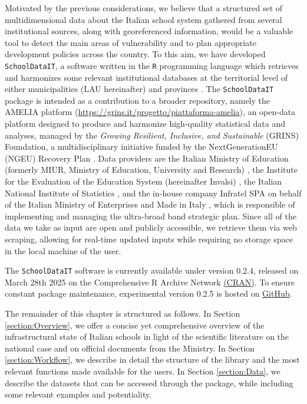 \documentclass{book}
\begin{document}
Motivated by the previous considerations, we believe that a structured set of multidimensional data about the Italian school system gathered from several institutional sources, along with georeferenced information, would be a valuable tool to detect the main areas of vulnerability and to plan appropriate development policies across the country. To this aim, we have developed \texttt{SchoolDataIT}, a software written in the \texttt{R} programming language \citep{R} which retrieves and harmonizes some relevant institutional databases at the territorial level of either municipalities (LAU hereinafter) and provinces \citep[NUTS-3 henceforth, ][]{NUTS2024}. 
The \texttt{SchoolDataIT} package is intended as a contribution to a broader repository, namely the AMELIA platform (\url{https://grins.it/progetto/piattaforma-amelia}), an open-data platform designed to produce and harmonize high-quality statistical data and analyses, managed by the \textit{Growing Resilient, Inclusive, and Sustainable} (GRINS) Foundation, a multidisciplinary initiative funded by the NextGenerationEU (NGEU) Recovery Plan \citep{CrescenziEtAl2021, DeLaPorteJensen2021}. 
Data providers are the Italian Ministry of Education (formerly MIUR, Ministry of Education, University and Research) \citep{MIUR}, the Institute for the Evaluation of the Education System (hereinafter Invalsi) \citep{Invalsi_IS}, the Italian National Institute of Statistics \citep[ISTAT,][]{InnerAreas, Situas, Shapefiles}, and the in-house company Infratel SPA on behalf of the Italian Ministry of Enterprises and Made in Italy \citep[MIMIT,][]{BB}, which is responsible of implementing and managing the ultra-broad band strategic plan. Since all of the data we take as input are open and publicly accessible, we retrieve them via web scraping, allowing for real-time updated inputs while requiring no storage space in the local machine of the user.


The \texttt{SchoolDataIT} software is currently available under version 0.2.4, released on March 28th 2025 on the Comprehensive R Archive Network \href{https://cran.r-project.org/web/packages/SchoolDataIT/index.html}{(CRAN)}. To ensure constant package maintenance, experimental version 0.2.5 is hosted on \href{https://github.com/lcef97/SchoolDataIT}{GitHub}.

The remainder of this chapter is structured as follows. In Section \ref{section:Overview}, we offer a concise yet comprehensive overview of the infrastructural state of Italian schools in light of the scientific literature on the national case and on official documents from the Ministry. In Section \ref{section:Workflow}, we describe in detail the structure of the library and the most relevant functions made available for the users. In Section \ref{section:Data}, we describe the datasets that can be accessed through the package, while including some relevant examples and potentiality.  
\end{document}
